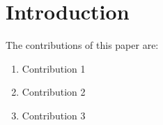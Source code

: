\section{Introduction}

The contributions of this paper are:

\begin{enumerate}
  \item Contribution 1
  \item Contribution 2
  \item Contribution 3
\end{enumerate}
